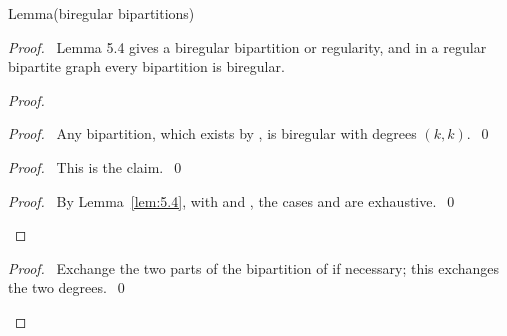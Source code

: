 \begin{namedresult}{Lemma}{(biregular bipartitions)}\label{lem:biregular}
\end{namedresult}
\begin{proof}
 \pfsketch\ Lemma 5.4 gives a biregular bipartition or regularity, and in a regular bipartite
 graph every bipartition is biregular.
 \begin{proof}
  \begin{proof}\pf\ Any bipartition, which exists by , is biregular with degrees
   $(k,k)$.~\qed\end{proof}
  \begin{proof}\pf\ This is the claim.~\qed\end{proof}
  \qedstep
  \begin{proof}\pf\ By Lemma~\ref{lem:5.4}, with  and , the cases
    and  are exhaustive.~\qed\end{proof}
 \end{proof}
 \qedstep
 \begin{proof}\pf\ Exchange the two parts of the bipartition of  if
  necessary; this exchanges the two degrees.~\qed\end{proof}
\end{proof}

